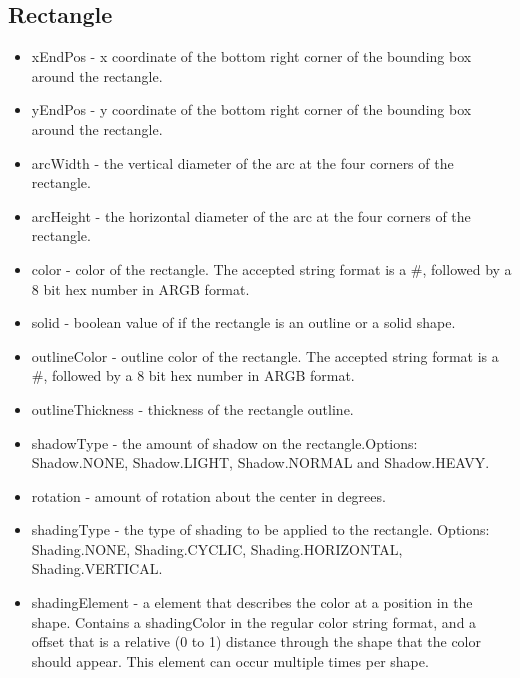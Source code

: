 \documentclass{article}
\begin{document}
\subsection{Rectangle}
\begin{itemize}
\item xEndPos - x coordinate of the bottom right corner of the bounding box around the rectangle.
\item yEndPos - y coordinate of the bottom right corner of the bounding box around the rectangle.
\item arcWidth - the vertical diameter of the arc at the four corners of the rectangle.
\item arcHeight - the horizontal diameter of the arc at the four corners of the rectangle.
\item color - color of the rectangle. The accepted string format is a \#, followed by a 8 bit hex number in ARGB format.
\item solid - boolean value of if the rectangle is an outline or a solid shape.
\item outlineColor - outline color of the rectangle. The accepted string format is a \#, followed by a 8 bit hex number in ARGB format.
\item outlineThickness - thickness of the rectangle outline.
\item shadowType - the amount of shadow on the rectangle.\newline  Options: Shadow.NONE, Shadow.LIGHT, Shadow.NORMAL and Shadow.HEAVY.
\item rotation - amount of rotation about the center in degrees. 
\item shadingType - the type of shading to be applied to the rectangle. \newline Options: Shading.NONE, Shading.CYCLIC, Shading.HORIZONTAL, Shading.VERTICAL.
\item shadingElement - a element that describes the color at a position in the shape. Contains a shadingColor in the regular color string format, and a offset that is a relative (0 to 1) distance through the shape that the color should appear. This element can occur multiple times per shape.
\end{itemize}
\end{document}
